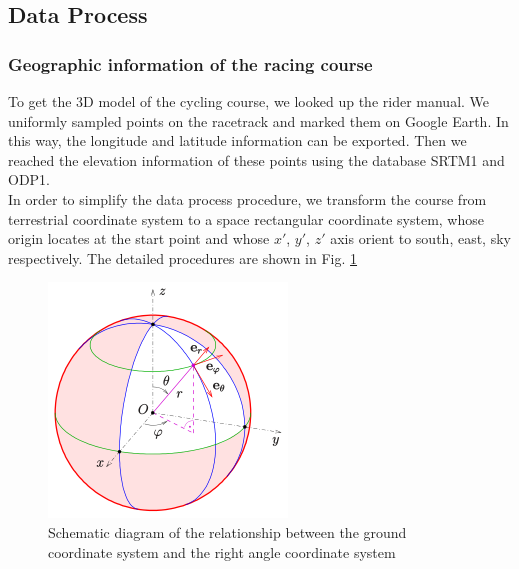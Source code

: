 \documentclass{mcmthesis}
\begin{document}
  \subsection{Data Process}

  \subsubsection{Geographic information of the racing course}
  To get the 3D model of the cycling course, we looked up the rider manual. We uniformly sampled points on the racetrack and marked them on Google Earth. In this way, the longitude and latitude information can be exported. Then we reached the elevation information of these points using the database SRTM1 and ODP1.\\
  In order to simplify the data process procedure, we transform the course from terrestrial coordinate system to a space rectangular coordinate system, whose origin locates at the start point and whose $x'$, $y'$, $z'$ axis orient to south, east, sky respectively. The detailed procedures are shown in Fig. \ref{fig:img1}
  \begin{figure}[H]
    \centering
    \includegraphics[width=0.4\linewidth]{image/earth_coord}
    \caption{Schematic diagram of the relationship between the ground coordinate system and the right angle coordinate system}%
    \label{fig:img1}
  \end{figure}
\end{document}
